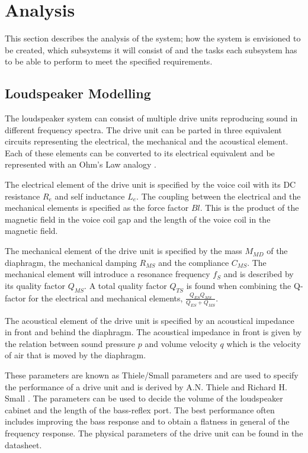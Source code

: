 
\chapter{Analysis}
\label{chap:analysis}
This section describes the analysis of the system; how the system is envisioned to be created, which subsystems it will consist of and the tasks each subsystem has to be able to perform to meet the specified requirements.

\section{Loudspeaker Modelling}
The loudspeaker system can consist of multiple drive units reproducing sound in different frequency spectra.
The drive unit can be parted in three equivalent circuits representing the electrical, the mechanical and the acoustical element. 
Each of these elements can be converted to its electrical equivalent and be represented with an Ohm's Law analogy \cite[p.~115]{Elektroakustik}.

The electrical element of the drive unit is specified by the voice coil with its DC resistance $R_e$ and self inductance $L_e$. 
The coupling between the electrical and the mechanical elements is specified as the force factor $Bl$. 
This is the product of the magnetic field in the voice coil gap and the length of the voice coil in the magnetic field. \cite[p.~34]{Elektroakustik}

The mechanical element of the drive unit is specified by the mass $M_{MD}$ of the diaphragm, the mechanical damping $R_{MS}$ and the compliance $C_{MS}$. 
The mechanical element will introduce a resonance frequency $f_S$ and is described by its quality factor $Q_{MS}$. 
A total quality factor $Q_{TS}$ is found when combining the Q-factor for the electrical and mechanical elements, $\frac{Q_{ES}Q_{MS}}{Q_{ES}+Q_{MS}}$.

The acoustical element of the drive unit is specified by an acoustical impedance in front and behind the diaphragm. 
The acoustical impedance in front is given by the relation between sound pressure $p$ and volume velocity $q$ which is the velocity of air that is moved by the diaphragm. 

These parameters are known as Thiele/Small parameters and are used to specify the performance of a drive unit and is derived by A.N. Thiele \cite{thiele1971loudspeakers} and Richard H. Small \cite{small1972closed}.
The parameters can be used to decide the volume of the loudspeaker cabinet and the length of the bass-reflex port. 
The best performance often includes improving the bass response and to obtain a flatness in general of the frequency response. 
The physical parameters of the drive unit can be found in the datasheet.

